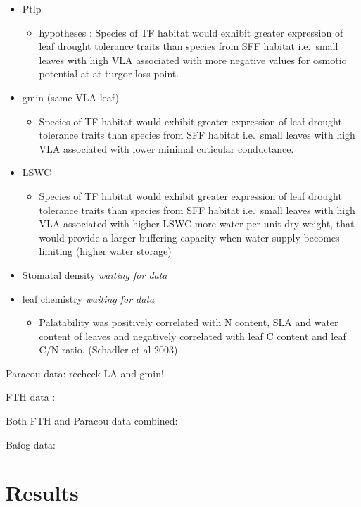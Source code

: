 \documentclass[
]{book}
\providecommand{\tightlist}{%
  \setlength{\itemsep}{0pt}\setlength{\parskip}{0pt}}
\begin{document}
\begin{itemize}
\tightlist
\item
  Ptlp

  \begin{itemize}
  \tightlist
  \item
    hypotheses : Species of TF habitat would exhibit greater expression of leaf drought tolerance traits than species from SFF habitat i.e.~small leaves with high VLA associated with more negative values for osmotic potential at at turgor loss point.
  \end{itemize}
\item
  gmin (same VLA leaf)

  \begin{itemize}
  \tightlist
  \item
    Species of TF habitat would exhibit greater expression of leaf drought tolerance traits than species from SFF habitat i.e.~small leaves with high VLA associated with lower minimal cuticular conductance.
  \end{itemize}
\item
  LSWC

  \begin{itemize}
  \tightlist
  \item
    Species of TF habitat would exhibit greater expression of leaf drought tolerance traits than species from SFF habitat i.e.~small leaves with high VLA associated with higher LSWC more water per unit dry weight, that would provide a larger buffering capacity when water supply becomes limiting (higher water storage)
  \end{itemize}
\item
  Stomatal density \emph{waiting for data}
\item
  leaf chemistry \emph{waiting for data}

  \begin{itemize}
  \tightlist
  \item
    Palatability was positively correlated with N content, SLA and water content of leaves and negatively correlated with leaf C content and leaf C/N-ratio. (Schadler et al 2003)
  \end{itemize}
\end{itemize}

Paracou data: recheck LA and gmin!

FTH data :

Both FTH and Paracou data combined:

Bafog data:

\hypertarget{results}{%
\section{Results}\label{results}}
\end{document}
